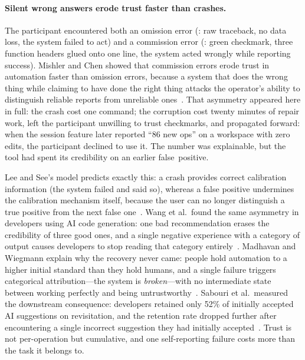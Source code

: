 \paragraph{Silent wrong answers erode trust faster than crashes.}
The participant encountered both an omission error (: raw traceback,
no data loss, the system failed to act) and a commission error (:
green checkmark, three function headers glued onto one line, the system acted
wrongly while reporting success). Mishler and Chen showed that commission errors
erode trust in automation faster than omission errors, because a system that does
the wrong thing while claiming to have done the right thing attacks the
operator's ability to distinguish reliable reports from unreliable
ones~\cite{mishler2023}. That asymmetry appeared here in full: the crash cost one command; the
corruption cost twenty minutes of repair work, left the participant unwilling to
trust checkmarks, and propagated forward: when the session feature later
reported ``86 new ops'' on a workspace with zero edits, the participant
declined to use it. The number was explainable, but the tool had spent its
credibility on an earlier false~positive.

Lee and See's model predicts exactly this: a crash provides
correct calibration information (the system failed and said so), whereas a false
positive undermines the calibration mechanism itself, because the user can no
longer distinguish a true positive from the next false
one~\cite{lee2004}. Wang et al.\ found the same asymmetry in developers using
AI code generation: one bad recommendation erases the credibility of three good
ones, and a single negative experience with a category of output causes
developers to stop reading that category
entirely~\cite{wang2024trust}. Madhavan and Wiegmann explain why the recovery
never came: people hold automation to a higher initial standard than they hold
humans, and a single failure triggers categorical attribution---the system is
\emph{broken}---with no intermediate state between working perfectly and being
untrustworthy~\cite{madhavan2007}. Sabouri et al.\ measured the downstream
consequence: developers retained only 52\% of initially accepted AI suggestions
on revisitation, and the retention rate dropped further after encountering a
single incorrect suggestion they had initially
accepted~\cite{sabouri2025}. Trust is not per-operation but cumulative, and one
self-reporting failure costs more than the task it belongs to.

